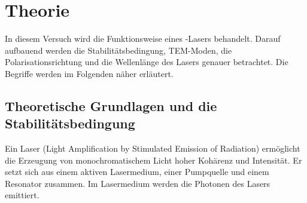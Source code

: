 \section{Theorie}
\label{sec:Theorie}
In diesem Versuch wird die Funktionsweise eines -Lasers behandelt. Darauf aufbauend werden
die Stabilitätsbedingung, TEM-Moden, die Polarisationsrichtung und die Wellenlänge des Lasers
genauer betrachtet. Die Begriffe werden im Folgenden näher erläutert.

\subsection{Theoretische Grundlagen und die Stabilitätsbedingung}
Ein Laser (Light Amplification by Stimulated Emission of Radiation) ermöglicht die Erzeugung
von monochromatischem Licht hoher Kohärenz und Intensität. Er setzt sich aus einem aktiven
Lasermedium, einer Pumpquelle und einem Resonator zusammen. Im Lasermedium werden die Photonen
des Lasers emittiert.

